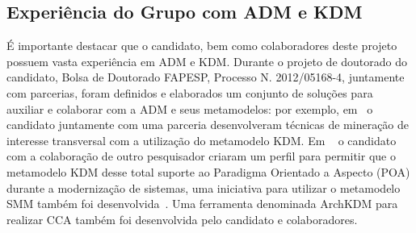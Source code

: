 \documentclass[12pt]{article}
\begin{document}


\subsection{Experiência do Grupo com ADM e KDM}

É importante destacar que o candidato, bem como colaboradores deste projeto possuem vasta experiência em ADM e KDM. Durante o projeto de doutorado do candidato, Bolsa de Doutorado FAPESP, Processo N. 2012/05168-4, juntamente com parcerias, foram definidos e elaborados um conjunto de soluções para auxiliar e colaborar com a ADM e seus metamodelos: por exemplo, em~\cite{dani_san_tool, dani_san, daniel_san_journal} o candidato juntamente com uma parceria desenvolveram técnicas de mineração de interesse transversal com a utilização do metamodelo KDM. Em ~\cite{Santos_2014, santo_wmod} o candidato com a colaboração de outro pesquisador criaram um perfil para permitir que o metamodelo KDM desse total suporte ao Paradigma Orientado a Aspecto (POA) durante a modernização de sistemas, uma iniciativa para utilizar o metamodelo SMM também foi desenvolvida~\cite{honda_dissertacao}.  Uma ferramenta denominada ArchKDM para realizar CCA também foi desenvolvida pelo candidato e colaboradores.
\end{document}
